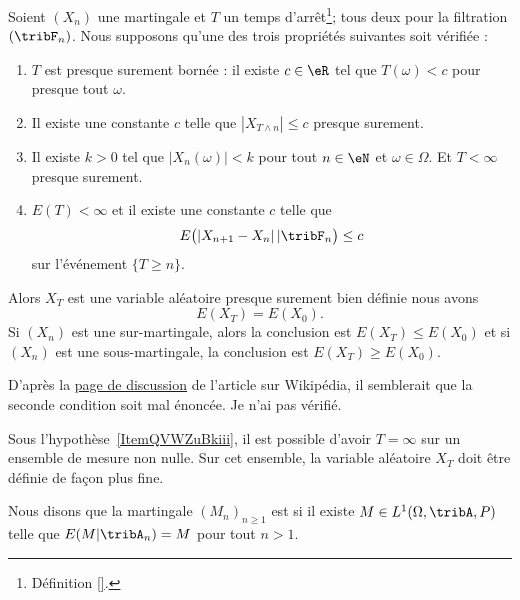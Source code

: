 \begin{theorem} \label{ThoZTrdjtZ}
	Soient \( (X_n)\) une martingale et \( T\) un temps d'arrêt\footnote{Définition \ref{}.}; tous deux pour la filtration \( (\tribF_n)\). Nous supposons qu'une des trois propriétés suivantes soit vérifiée :
	\begin{enumerate}
		\item
		      \( T\) est presque surement bornée : il existe \( c\in \eR\) tel que \( T(\omega)<c\) pour presque tout \( \omega\).
		\item   \label{ItemQVWZuBkiii}
		      Il existe une constante \( c\) telle que \( | X_{T\wedge n} |\leq c\) presque surement.
		\item
		      Il existe \( k>0\) tel que \( | X_n(\omega) |<k\) pour tout \( n\in \eN\) et \( \omega\in\Omega\). Et \( T<\infty\) presque surement.
		\item
		      \( E(T)<\infty\) et il existe une constante \( c\) telle que
		      \begin{equation}
			      E\big( | X_{n+1}-X_n |\,|\tribF_n \big)\leq c
		      \end{equation}
		      sur l'événement \( \{ T\geq n \}\).
	\end{enumerate}
	Alors \( X_T\) est une variable aléatoire presque surement bien définie nous avons
	\begin{equation}
		E(X_T)=E(X_0).
	\end{equation}
	Si \( (X_n)\) est une sur-martingale, alors la conclusion est \( E(X_T)\leq E(X_0)\) et si \( (X_n)\) est une sous-martingale, la conclusion est \( E(X_T)\geq E(X_0)\).
\end{theorem}

\begin{probleme}
	D'après la \href{https://en.wikipedia.org/wiki/Talk:Optional_stopping_theorem}{page de discussion} de l'article sur Wikipédia, il semblerait que la seconde condition soit mal énoncée. Je n'ai pas vérifié.
\end{probleme}

\begin{remark}
	Sous l'hypothèse~\ref{ItemQVWZuBkiii}, il est possible d'avoir \( T=\infty\) sur un ensemble de mesure non nulle. Sur cet ensemble, la variable aléatoire \( X_T\) doit être définie de façon plus fine.
\end{remark}

\begin{definition}
	Nous disons que la martingale \( (M_n)_{n\geq 1}\) est  si il existe \( M\in L^1(\Omega,\tribA,P)\) telle que \( E(M|\tribA_n)=M\) pour tout \( n>1\).
\end{definition}

